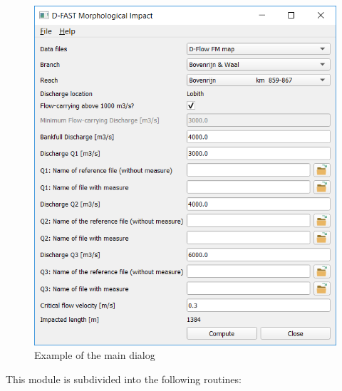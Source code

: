 \begin{figure}
\center
\includegraphics[width=12cm]{figures/main_dialog.png}
\caption{Example of the main dialog}
\end{figure}

This module is subdivided into the following routines:

